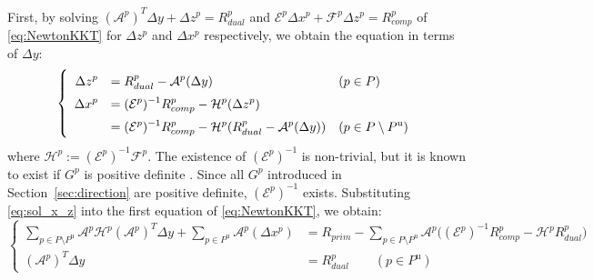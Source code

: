 First, by solving $(\mathcal{A}^p)^T \Delta y + \Delta z^p = R_{dual}^p$ and $\mathcal{E}^p \Delta x^p + \mathcal{F}^p \Delta z^p = R_{comp}^p$ of \eqref{eq:NewtonKKT} for $\Delta z^p$ and $\Delta x^p$ respectively, we obtain the equation in terms of $\Delta y$:
\begin{equation}
    \everymath{\displaystyle}
    \renewcommand{\arraystretch}{1.5}
    \left\{
    \begin{array}{rll}
    \Delta z^p &= R_{dual}^p - \mathcal{A}^p(\Delta y)  & (p\in P)\\
    \Delta x^p &= (\mathcal{E}^p)^{-1}R_{comp}^p - \mathcal{H}^p(\Delta z^p) \\
               &= (\mathcal{E}^p)^{-1}R_{comp}^p - \mathcal{H}^p(R_{dual}^p - \mathcal{A}^p(\Delta y))  & (p\in P\setminus P^{\text{u}})
   \end{array}
   \right.
   \label{eq:sol_x_z}
\end{equation}
where $\mathcal{H}^p := (\mathcal{E}^p)^{-1}\mathcal{F}^p$. 
The existence of $(\mathcal{E}^p)^{-1}$ is non-trivial, but it is known to exist if $G^p$ is positive definite \cite{todd1998}. 
Since all $G^p$ introduced in Section~\ref{sec:direction} are positive definite, $(\mathcal{E}^p)^{-1}$ exists.
Substituting \eqref{eq:sol_x_z} into the first equation of \eqref{eq:NewtonKKT}, we obtain:
\begin{equation}
    \left\{
    \begin{aligned}
        \sum_{p \in P\setminus P^{\text{u}}} \mathcal{A}^p\mathcal{H}^p(\mathcal{A}^p)^T\Delta y + \sum_{p \in P^{\text{u}}} \mathcal{A}^p(\Delta x^p) 
            &= R_{prim} - \sum_{p \in P\setminus P^{\text{u}}} \mathcal{A}^p \big( (\mathcal{E}^p)^{-1}R_{comp}^p - \mathcal{H}^p R_{dual}^p \big) \\
        (\mathcal{A}^p)^T \Delta y 
            &= R^p_{dual} \qquad (p\in P^{\text{u}})
    \end{aligned}
    \right.
    \label{eq:Schur_complement}
\end{equation}

\medskip

